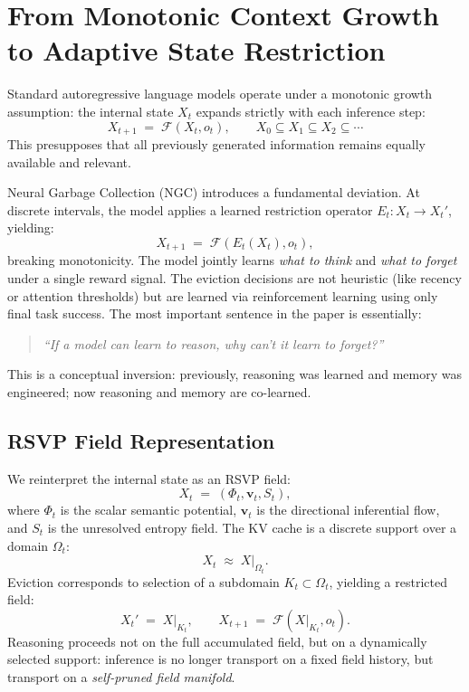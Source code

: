 \documentclass[11pt, letterpaper]{article}
\theoremstyle{plain}
\theoremstyle{definition}
\theoremstyle{remark}
\begin{document}
\section{From Monotonic Context Growth to Adaptive State Restriction}

Standard autoregressive language models operate under a monotonic growth assumption:
the internal state $X_t$ expands strictly with each inference step:
\[
  X_{t+1} \;=\; \mathcal{F}(X_t, o_t),
  \qquad X_0 \subseteq X_1 \subseteq X_2 \subseteq \cdots
\]
This presupposes that all previously generated information remains equally available
and relevant.

Neural Garbage Collection (NGC) \cite{ngc2026} introduces a fundamental deviation. At
discrete intervals, the model applies a learned restriction operator
$E_t: X_t \to X_t'$, yielding:
\[
  X_{t+1} \;=\; \mathcal{F}(E_t(X_t), o_t),
\]
breaking monotonicity. The model jointly learns \emph{what to think} and \emph{what to
forget} under a single reward signal. The eviction decisions are not heuristic (like
recency or attention thresholds) but are learned via reinforcement learning using only
final task success. The most important sentence in the paper is essentially:
\begin{quote}\itshape
``If a model can learn to reason, why can't it learn to forget?''
\end{quote}
This is a conceptual inversion: previously, reasoning was learned and memory was
engineered; now reasoning and memory are co-learned.

\subsection{RSVP Field Representation}

We reinterpret the internal state as an RSVP field:
\[
  X_t \;=\; (\Phi_t, \mathbf{v}_t, S_t),
\]
where $\Phi_t$ is the scalar semantic potential, $\mathbf{v}_t$ is the directional
inferential flow, and $S_t$ is the unresolved entropy field. The KV cache is a
discrete support over a domain $\Omega_t$:
\[
  X_t \;\approx\; X|_{\Omega_t}.
\]
Eviction corresponds to selection of a subdomain $K_t \subset \Omega_t$, yielding a
restricted field:
\[
  X_t' \;=\; X|_{K_t},
  \qquad
  X_{t+1} \;=\; \mathcal{F}(X|_{K_t}, o_t).
\]
Reasoning proceeds not on the full accumulated field, but on a dynamically selected
support: inference is no longer transport on a fixed field history, but transport on a
\emph{self-pruned field manifold}.
\end{document}
